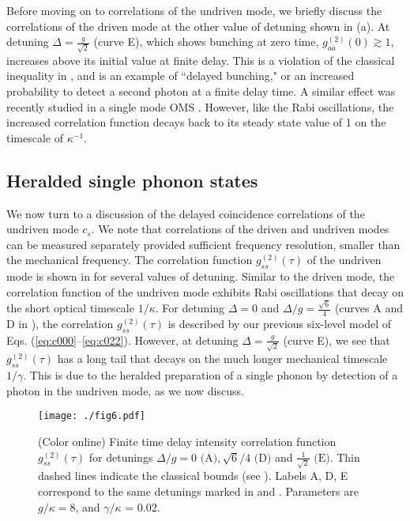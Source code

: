 Before moving on to correlations of the undriven mode,
we briefly discuss the correlations of the driven mode at the
 other value of  detuning shown in 
(a).
 At detuning
$\Delta = \frac{g}{\sqrt{2}}$ (curve E),
which shows bunching at zero time,
$g^{(2)}_{aa}(0) \gtrsim 1$, 
increases  above its initial value at
finite delay.
This is a violation of the classical inequality in
, 
and is an example of ``delayed bunching,"
or an increased probability to detect a second
photon at a finite delay time.
A similar effect was recently studied
in a single mode OMS \cite{Kronwald2012}.
However, like the Rabi oscillations,
the increased correlation function decays back to its steady state
value of 1 on
the timescale of $\kappa^{-1}$.





\subsection{Heralded single phonon states}

We now turn to a discussion of the delayed coincidence
correlations of the undriven mode $c_s$.
We note that correlations of the driven
and undriven modes can be measured separately
provided sufficient frequency resolution, smaller than
  the mechanical frequency.
The correlation function
$g^{(2)}_{ss}(\tau)$
of the undriven mode
is shown in  for several
values of detuning.
Similar to the driven mode, the
correlation function of the undriven mode
exhibits Rabi oscillations 
that decay on the short optical
timescale
$1/\kappa$.
For detuning $\Delta = 0$ and 
$\Delta/g = \frac{\sqrt{6}}{4}$
(curves A and D in ),
the correlation $g^{(2)}_{ss}(\tau)$
is described by
our previous six-level 
model of Eqs. (\ref{eq:c000}--\ref{eq:c022}).
However,  at detuning $\Delta = \frac{g}{\sqrt{2}}$
(curve E), we see that
$g^{(2)}_{ss}(\tau)$ has a long
tail that decays
on the much longer mechanical timescale $1/\gamma$.
This is due to the heralded preparation
of a single phonon by detection of a photon in the
undriven mode, as we now discuss.
\begin{figure}[htb] \centering
  \texttt{[image: ./fig6.pdf]}
  \caption{
  \label{fig:g2sstau}(Color online)
  Finite time delay intensity correlation function $g^{(2)}_{ss}(\tau)$
  for detunings $\Delta/g = 0 \text{ (A)}, \sqrt{6}/4 \text{ (D)}$
  and
  $\frac{1}{\sqrt{2}} \text{ (E)}$.
  Thin dashed lines indicate the classical bounds
  (see  ).
  Labels A, D, E correspond to the same detunings
  marked in 
  and
  .
  Parameters are $g/\kappa = 8$, and $\gamma/\kappa$ = 0.02.
  }
\end{figure}



